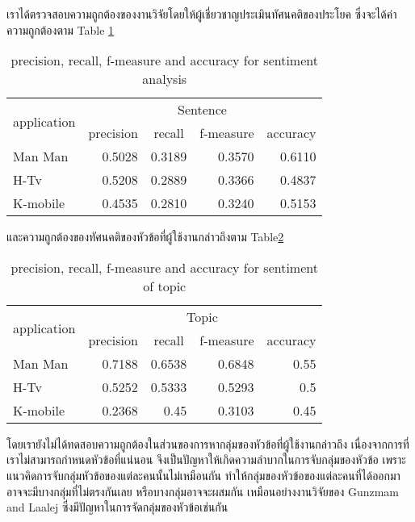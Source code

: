 
เราได้ตรวจสอบความถูกต้องของงานวิจัยโดยให้ผู้เชี่ยวชาญประเมินทัศนคติของประโยค ซึ่งจะได้ค่าความถูกต้องตาม Table \ref{table:f-measureSenti}
\begin{table}
	\caption{precision, recall, f-measure and accuracy for sentiment analysis}
	\label{table:f-measureSenti}
	\centering
	\begin{tabular}{|l|r|r|r|r|}
		\hline
		\multicolumn{1}{|c|}{\multirow{2}{*}{application}} &
		\multicolumn{4}{|c|}{Sentence}\\
		\cline{2-5}
		\multicolumn{1}{|c|}{}&
		\multicolumn{1}{|c|}{precision}&
		\multicolumn{1}{|c|}{recall}&
		\multicolumn{1}{|c|}{f-measure} &
		\multicolumn{1}{|c|}{accuracy} \\
		\hline
		Man Man & 0.5028 & 0.3189 & 0.3570 & 0.6110\\
		\hline
		H-Tv & 0.5208 & 0.2889 & 0.3366 & 0.4837 \\
		\hline
		K-mobile & 0.4535 & 0.2810 & 0.3240 & 0.5153 \\
		\hline
	\end{tabular}
\end{table}

และความถูกต้องของทัศนคติของหัวข้อที่ผู้ใช้งานกล่าวถึงตาม Table\ref{table:f-measureTopic}
\begin{table}
	\caption{precision, recall, f-measure and accuracy for sentiment of topic}
	\label{table:f-measureTopic}
	\centering
	\begin{tabular}{|l|r|r|r|r|}
		\hline
		\multicolumn{1}{|c|}{\multirow{2}{*}{application}} & 
		\multicolumn{4}{|c|}{Topic} \\
		\cline{2-5}
		\multicolumn{1}{|c|}{} &
		\multicolumn{1}{|c|}{precision}&
		\multicolumn{1}{|c|}{recall}&
		\multicolumn{1}{|c|}{f-measure} &
		\multicolumn{1}{|c|}{accuracy} \\
		\hline
		Man Man & 0.7188 & 0.6538 & 0.6848 & 0.55\\
		\hline
		H-Tv & 0.5252 & 0.5333 & 0.5293 & 0.5\\
		\hline
		K-mobile & 0.2368 & 0.45 & 0.3103 & 0.45\\
		\hline
	\end{tabular}
\end{table}

โดยเรายังไม่ได้ทดสอบความถูกต้องในส่วนของการหากลุ่มของหัวข้อที่ผู้ใช้งานกล่าวถึง เนื่องจากการที่เราไม่สามารถกำหนดหัวข้อที่แน่นอน จึงเป็นปัญหาให้เกิดความลำบากในการจับกลุ่มของหัวข้อ เพราะแนวคิดการจับกลุ่มหัวข้อของแต่ละคนนั้นไม่เหมือนกัน ทำให้กลุ่มของหัวข้อของแต่ละคนที่ได้ออกมาอาจจะมีบางกลุ่มที่ไม่ตรงกันเลย หรือบางกลุ่มอาจจะผสมกัน เหมือนอย่างงานวิจัยของ Gunzmam and Laalej \cite{userslikefeature} ซึ่งมีปัญหาในการจัดกลุ่มของหัวข้อเช่นกัน

